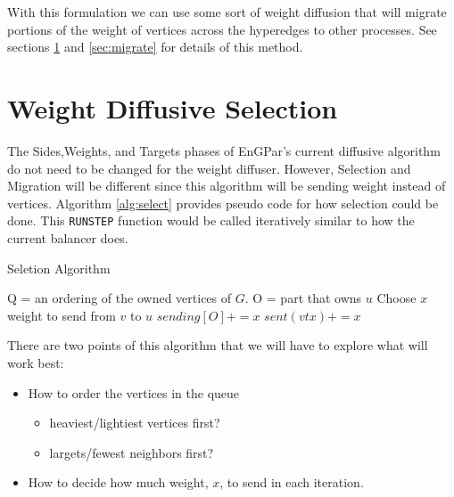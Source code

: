 \documentclass[a4paper]{article}
\begin{document}
With this formulation we can use some sort of weight diffusion that will
migrate portions of the weight of vertices across the hyperedges to other
processes. {\color{blue} See sections \ref{sec:select} and \ref{sec:migrate}
for details of this method.}


{\color{blue}
  \section{Weight Diffusive Selection}
  \label{sec:select}

  The Sides,Weights, and Targets phases of EnGPar's current diffusive algorithm do not need to be changed for the weight diffuser. However, Selection and Migration will be different since this algorithm will be sending weight instead of vertices. Algorithm \ref{alg:select} provides pseudo code for how selection could be done. This \texttt{RUNSTEP} function would be called iteratively similar to how the current balancer does.

  \begin{algorithm}
    \caption{Seletion Algorithm}
    \label{alg:select}
    \small
    \begin{algorithmic}[1]
      \State Q = an ordering of the owned vertices of $G$.
      \State O = part that owns $u$
      \State Choose $x$ weight to send from $v$ to $u$
      \State
      \State $sending[O] += x$
      \State $sent(vtx) += x$
      \EndIf
      \EndFor
      \EndFor
      \EndProcedure
    \end{algorithmic}
  \end{algorithm}

  \noindent There are two points of this algorithm that we will have to explore what will work best:
  \begin{itemize}
  \item How to order the vertices in the queue
    \begin{itemize}
    \item heaviest/lightiest vertices first?
    \item largets/fewest neighbors first?
    \end{itemize}
  \item How to decide how much weight, $x$, to send in each iteration.
  \end{itemize}

}
\end{document}
